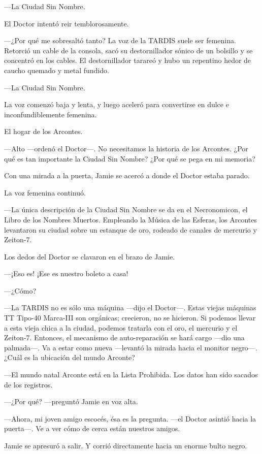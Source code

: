 ---La Ciudad Sin Nombre.

El Doctor intentó reir temblorosamente.~

---¿Por qué me sobresaltó tanto? La voz de la TARDIS suele ser femenina.
Retorció un cable de la consola, sacó su destornillador sónico de un
bolsillo y se concentró en los cables. El destornillador tarareó y hubo
un repentino hedor de caucho quemado y metal fundido.

---La Ciudad Sin Nombre.

La voz comenzó baja y lenta, y luego aceleró para convertirse en dulce e
inconfundiblemente femenina.

El hogar de los Arcontes.

---Alto ---ordenó el Doctor---. No necesitamos la historia de los
Arcontes. ¿Por qué es tan importante la Ciudad Sin Nombre? ¿Por qué se
pega en mi memoria?

Con una mirada a la puerta, Jamie se acercó a donde el Doctor estaba
parado.

La voz femenina continuó.~

---La única descripción de la Ciudad Sin Nombre se da en el
Necronomicon, el Libro de los Nombres Muertos. Empleando la Música de
las Esferas, los Arcontes levantaron su ciudad sobre un estanque de oro,
rodeado de canales de mercurio y Zeiton-7.

Los dedos del Doctor se clavaron en el brazo de Jamie.~

---¡Eso es! ¡Ese es nuestro boleto a casa!

---¿Cómo?

---La TARDIS no es sólo una máquina ---dijo el Doctor---. Estas viejas
máquinas TT Tipo-40 Marca-III son orgánicas; crecieron, no se hicieron.
Si podemos llevar a esta vieja chica a la ciudad, podemos tratarla con
el oro, el mercurio y el Zeiton-7. Entonces, el mecanismo de
auto-reparación se hará cargo ---dio una palmada---. Va a estar como
nueva ---levantó la mirada hacia el monitor negro---. ¿Cuál es la
ubicación del mundo Arconte?

---El mundo natal Arconte está en la Lista Prohibida. Los datos han sido
sacados de los registros.

---¿Por qué? ---preguntó Jamie en voz alta.

---Ahora, mi joven amigo escocés, ésa es la pregunta. ---el Doctor
asintió hacia la puerta---. Ve a ver cómo de cerca están nuestros
amigos.

Jamie se apresuró a salir. Y corrió directamente hacia un enorme bulto
negro.

